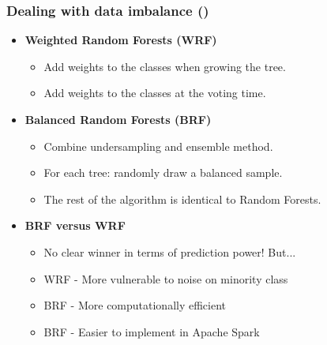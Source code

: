 \documentclass[slidestop,compress,red,mathserif]{beamer}
\newcommand{\colorcite}[1]{\colorlet{saved}{.}\color{sangria}\cite{#1}\color{saved}}
\begin{document}
\begin{frame}
\frametitle{Dealing with data imbalance (\colorcite{Chen2004})}
\begin{itemize}
  \item[] \textbf{Weighted Random Forests (WRF)}
    \begin{itemize}
      \item Add weights to the classes when growing the tree.
      \item Add weights to the classes at the voting time.
    \end{itemize}

  \item[] \textbf{Balanced Random Forests (BRF)}
    \begin{itemize}
      \item Combine undersampling and ensemble method.
      \item For each tree: randomly draw a balanced sample.
      \item The rest of the algorithm is identical to Random Forests.
    \end{itemize}

  \item[] \textbf{BRF versus WRF}
    \begin{itemize}
      \item No clear winner in terms of prediction power! But...
      \item WRF - More vulnerable to noise on minority class
      \item BRF - More computationally efficient
      \item BRF - Easier to implement in Apache Spark
    \end{itemize}
\end{itemize}
\end{frame}
\end{document}
